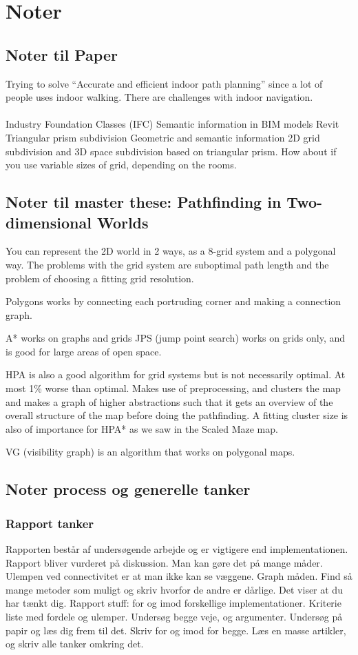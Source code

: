 \section{Noter}
\subsection{Noter til Paper}
Trying to solve “Accurate and efficient indoor path planning” since a lot of 
people uses indoor walking. There are challenges with indoor navigation.
\\\\
Industry Foundation Classes (IFC)
Semantic information in BIM models
Revit
Triangular prism subdivision
Geometric and semantic information
2D grid subdivision and 3D space subdivision based on triangular prism.
How about if you use variable sizes of grid, depending on the rooms.


\subsection{Noter til master these: Pathfinding in Two-dimensional
Worlds }

You can represent the 2D world in 2 ways, as a 8-grid system and a polygonal way. 
The problems with the grid system are suboptimal path length and the problem of choosing a fitting grid resolution.

Polygons works by connecting each portruding corner and making a connection graph.

A* works on graphs and grids
JPS (jump point search) works on grids only, and is good for large areas of open space.

HPA is also a good algorithm for grid systems but is not necessarily optimal. At most 1\% worse than optimal. 
Makes use of preprocessing, and clusters the map and makes a graph of higher abstractions such that it gets an overview 
of the overall structure of the map before doing the pathfinding.
A fitting cluster size is also of importance for HPA* as we saw in the Scaled Maze map.

VG (visibility graph)
is an algorithm that works on polygonal maps.



\subsection{Noter process og generelle tanker}
\subsubsection{Rapport tanker}
Rapporten består af undersøgende arbejde og er vigtigere end implementationen.
Rapport bliver vurderet på diskussion.
Man kan gøre det på mange måder.
Ulempen ved connectivitet er at man ikke kan se væggene. Graph måden.
Find så mange metoder som muligt og skriv hvorfor de andre er dårlige.
Det viser at du har tænkt dig.
Rapport stuff: for og imod forskellige implementationer.
Kriterie liste med fordele og ulemper.
Undersøg begge veje, og argumenter.
Undersøg på papir og læs dig frem til det. Skriv for og imod for begge.
Læs en masse artikler, og skriv alle tanker omkring det.

